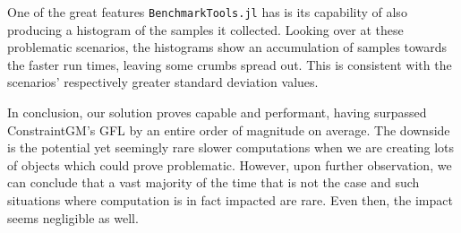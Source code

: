 One of the great features \texttt{BenchmarkTools.jl} has is its capability of
also producing a histogram of the samples it collected.  Looking over at these
problematic scenarios, the histograms show an accumulation of samples towards
the faster run times, leaving some crumbs spread out.  This is consistent with
the scenarios' respectively greater standard deviation values.

In conclusion, our solution proves capable and performant, having surpassed
ConstraintGM's \ac{GFL} by an entire order of magnitude on average.  The
downside is the potential yet seemingly rare slower computations when we are
creating lots of objects which could prove problematic.  However, upon further
observation, we can conclude that a vast majority of the time that is not the
case and such situations where computation is in fact impacted are rare.  Even
then, the impact seems negligible as well.
